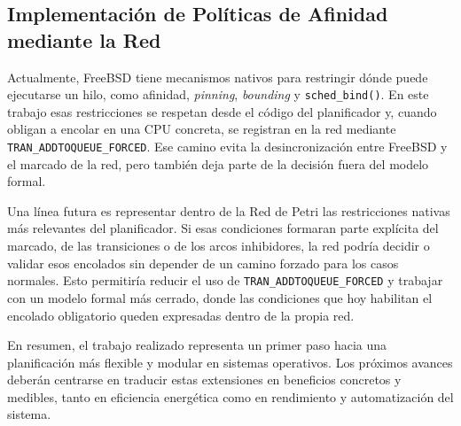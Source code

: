 \subsection{Implementación de Políticas de Afinidad mediante la Red}
Actualmente, FreeBSD tiene mecanismos nativos para restringir dónde puede ejecutarse un hilo, como afinidad, \textit{pinning}, \textit{bounding} y \verb|sched_bind()|. En este trabajo esas restricciones se respetan desde el código del planificador y, cuando obligan a encolar en una CPU concreta, se registran en la red mediante \verb|TRAN_ADDTOQUEUE_FORCED|. Ese camino evita la desincronización entre FreeBSD y el marcado de la red, pero también deja parte de la decisión fuera del modelo formal.\par

Una línea futura es representar dentro de la Red de Petri las restricciones nativas más relevantes del planificador. Si esas condiciones formaran parte explícita del marcado, de las transiciones o de los arcos inhibidores, la red podría decidir o validar esos encolados sin depender de un camino forzado para los casos normales. Esto permitiría reducir el uso de \verb|TRAN_ADDTOQUEUE_FORCED| y trabajar con un modelo formal más cerrado, donde las condiciones que hoy habilitan el encolado obligatorio queden expresadas dentro de la propia red.\par

En resumen, el trabajo realizado representa un primer paso hacia una planificación más flexible y modular en sistemas operativos. Los próximos avances deberán centrarse en traducir estas extensiones en beneficios concretos y medibles, tanto en eficiencia energética como en rendimiento y automatización del sistema.\par
